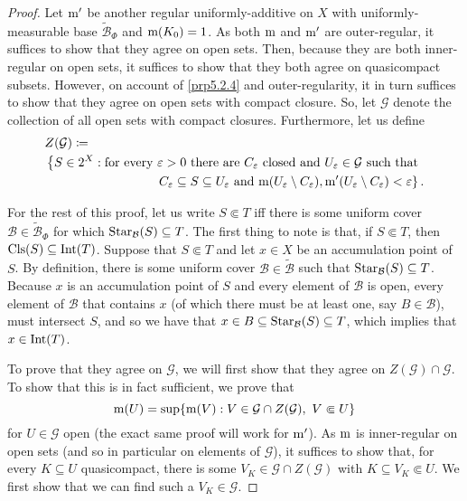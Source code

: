\begin{thm}
\begin{savenotes}
\begin{proof}
Let $\mathrm{m} '$ be another regular uniformly-additive on $X$ with uniformly-measurable base $\widetilde{\mathcal{B}}_\Phi$ and $\mathrm{m} (K_0)=1$.  As both $\mathrm{m}$ and $\mathrm{m} '$ are outer-regular, it suffices to show that they agree on open sets.  Then, because they are both inner-regular on open sets, it suffices to show that they both agree on quasicompact subsets.  However, on account of \cref{prp5.2.4} and outer-regularity, it in turn suffices to show that they agree on open sets with compact closure.  So, let $\mathcal{G}$ denote the collection of all open sets with compact closures.  Furthermore, let us define
\begin{equation}
\begin{multlined}
Z(\mathcal{G})\coloneqq \\ \left\{ S\in 2^X:\text{for every }\varepsilon >0\text{ there are }C_{\varepsilon}\text{ closed and }U_{\varepsilon}\in \mathcal{G}\text{ such that }\right. \\ \left. C_\varepsilon \subseteq S\subseteq U_{\varepsilon}\text{ and }\meas (U_{\varepsilon}\setminus C_{\varepsilon}),\meas '(U_{\varepsilon}\setminus C_{\varepsilon})<\varepsilon \right\} .
\end{multlined}
\end{equation}

For the rest of this proof, let us write $S\Subset T$ iff there is some uniform cover $\mathcal{B}\in \widetilde{\mathcal{B}}_\Phi$ for which $\operatorname{Star} _{\mathcal{B}}(S)\subseteq T$.  The first thing to note is that, if $S\Subset T$, then $\operatorname{Cls} (S)\subseteq \operatorname{Int} (T)$.  Suppose that $S\Subset T$ and let $x\in X$ be an accumulation point of $S$.  By definition, there is some uniform cover $\mathcal{B}\in \widetilde{\mathcal{B}}$ such that $\operatorname{Star} _{\mathcal{B}}(S)\subseteq T$.  Because $x$ is an accumulation point of $S$ and every element of $\mathcal{B}$ is open, every element of $\mathcal{B}$ that contains $x$ (of which there must be at least one, say $B\in \mathcal{B}$), must intersect $S$, and so we have that $x\in B\subseteq \operatorname{Star} _{\mathcal{B}}(S)\subseteq T$, which implies that $x\in \operatorname{Int} (T)$.

To prove that they agree on $\mathcal{G}$, we will first show that they agree on $Z(\mathcal{G})\cap \mathcal{G}$.  To show that this is in fact sufficient, we prove that
\begin{equation}\label{5.1.75}
\meas (U)=\sup \{ \meas (V):V\in \mathcal{G}\cap Z(\mathcal{G}),\ V\Subset U\} 
\end{equation}
for $U\in \mathcal{G}$ open (the exact same proof will work for $\mathrm{m} '$).  As $\mathrm{m}$ is inner-regular on open sets (and so in particular on elements of $\mathcal{G}$), it suffices to show that, for every $K\subseteq U$ quasicompact, there is some $V_K\in \mathcal{G}\cap Z(\mathcal{G})$ with $K\subseteq V_K\Subset U$.  We first show that we can find such a $V_K\in \mathcal{G}$.


\end{proof}
\end{savenotes}
\end{thm}
